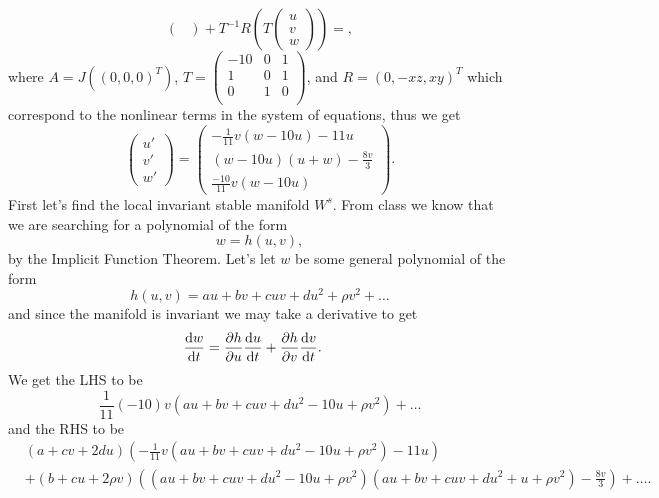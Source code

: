 \documentclass[12pt]{report}
\begin{document}
\begin{solution}
\begin{enumerate}
\[\begin{pmatrix}
            \end{pmatrix}  + T^{-1}R\left(T \begin{pmatrix}
                u\\v\\w
            \end{pmatrix}\right) = ,
        \]
        where $A = J((0,0,0)^T)$, $T=\left(
            \begin{array}{ccc}
             -10 & 0 & 1 \\
             1 & 0 & 1 \\
             0 & 1 & 0 \\
            \end{array}
            \right)$, and $R = (0,-xz,xy)^T$ which correspond to the nonlinear terms in the system of equations, thus we get
        \[ 
            \begin{pmatrix}
                u'\\v'\\w'
            \end{pmatrix} = \begin{pmatrix}
                -\frac{1}{11} v (w-10 u)-11 u\\(w-10 u) (u+w)-\frac{8 v}{3}\\\frac{-10}{11}  v (w-10 u)
            \end{pmatrix}.
        \]
        First let's find the local invariant stable manifold $W^s$. From class we know that we are searching for a polynomial of the form
        \[ 
            w = h(u,v),
        \]
        by the Implicit Function Theorem. Let's let $w$ be some general polynomial of the form
        \[ 
            h(u,v) = a u + b v + c u v + d u^2 + \rho v^2 + \dots
        \]
        and since the manifold is invariant we may take a derivative to get
        \begin{align*}
            \frac{\mathrm{d} w}{\mathrm{d} t} &= \frac{\partial h}{\partial u}\frac{\mathrm{d} u}{\mathrm{d} t} + \frac{\partial h}{\partial v}\frac{\mathrm{d} v}{\mathrm{d} t}.
        \end{align*} 
        We get the LHS to be
        \[ 
            \frac{1}{11} (-10) v \left(a u+b v+c u v+d u^2-10 u+\rho  v^2\right) + \dots
        \]
        and the RHS to be 
        \begin{align*}
            &(a+c v+2 d u) \left(-\frac{1}{11} v \left(a u+b v+c u v+d u^2-10 u+\rho  v^2\right)-11 u\right)\\ 
            &+(b+c u+2 \rho  v) \left(\left(a u+b v+c u v+d u^2-10 u+\rho  v^2\right) \left(a u+b v+c u v+d u^2+u+\rho  v^2\right)-\frac{8 v}{3}\right) + \dots.
        \end{align*} 

\end{enumerate}
\end{solution}
\end{document}
